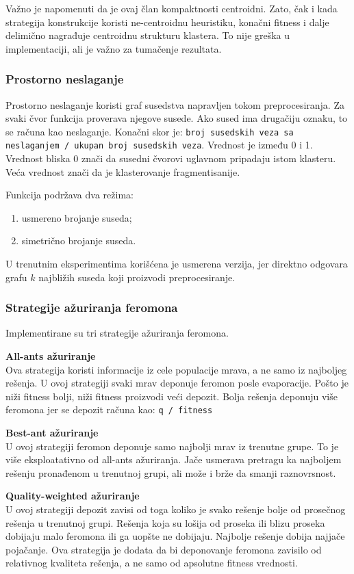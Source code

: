 \documentclass[11pt]{article}
\begin{document}
Važno je napomenuti da je ovaj član kompaktnosti centroidni. Zato, čak i kada strategija konstrukcije koristi ne-centroidnu heuristiku, konačni fitness i dalje delimično nagrađuje centroidnu strukturu klastera. To nije greška u implementaciji, ali je važno za tumačenje rezultata.

\subsubsection{Prostorno neslaganje}
Prostorno neslaganje koristi graf susedstva napravljen tokom preprocesiranja. Za svaki čvor funkcija proverava njegove susede. Ako sused ima drugačiju oznaku, to se računa kao neslaganje. Konačni skor je:
\texttt{broj susedskih veza sa neslaganjem / ukupan broj susedskih veza}. Vrednost je između 0 i 1. Vrednost bliska 0 znači da susedni čvorovi uglavnom pripadaju istom klasteru. Veća vrednost znači da je klasterovanje fragmentisanije.

Funkcija podržava dva režima:
\begin{enumerate}
  \item usmereno brojanje suseda;
  \item simetrično brojanje suseda.
\end{enumerate}

U trenutnim eksperimentima korišćena je usmerena verzija, jer direktno odgovara grafu $k$ najbližih suseda koji proizvodi preprocesiranje.

\subsubsection{Strategije ažuriranja feromona}
Implementirane su tri strategije ažuriranja feromona.

\textbf{All-ants ažuriranje} \\
Ova strategija koristi informacije iz cele populacije mrava, a ne samo iz najboljeg rešenja. U ovoj strategiji svaki mrav deponuje feromon posle evaporacije. Pošto je niži fitness bolji, niži fitness proizvodi veći depozit. Bolja rešenja deponuju više feromona jer se depozit računa kao:
\texttt{q / fitness}

\textbf{Best-ant ažuriranje} \\
U ovoj strategiji feromon deponuje samo najbolji mrav iz trenutne grupe. To je više eksploatativno od all-ants ažuriranja. Jače usmerava pretragu ka najboljem rešenju pronađenom u trenutnoj grupi, ali može i brže da smanji raznovrsnost.

\textbf{Quality-weighted ažuriranje} \\
U ovoj strategiji depozit zavisi od toga koliko je svako rešenje bolje od prosečnog rešenja u trenutnoj grupi. Rešenja koja su lošija od proseka ili blizu proseka dobijaju malo feromona ili ga uopšte ne dobijaju. Najbolje rešenje dobija najjače pojačanje. Ova strategija je dodata da bi deponovanje feromona zavisilo od relativnog kvaliteta rešenja, a ne samo od apsolutne fitness vrednosti.
\end{document}
